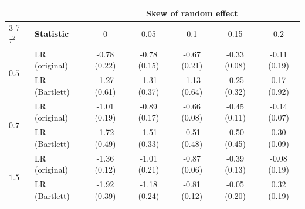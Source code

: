 \begin{tabular}{llccccc}
\toprule
 &  & \multicolumn{5}{c}{\textbf{Skew of random effect}} \\
\cmidrule(lr){3-7}
\textbf{$\tau^2$} & \textbf{Statistic} & 0 & 0.05 & 0.1 & 0.15 & 0.2 \\
\midrule
\multirow{2}{*}{$0.5$} & LR (original) & -0.78 (0.22) & -0.78 (0.15) & -0.67 (0.21) & -0.33 (0.08) & -0.11 (0.19) \\
 & LR (Bartlett) & -1.27 (0.61) & -1.31 (0.37) & -1.13 (0.64) & -0.25 (0.32) & 0.17 (0.92) \\
\midrule
\multirow{2}{*}{$0.7$} & LR (original) & -1.01 (0.19) & -0.89 (0.17) & -0.66 (0.08) & -0.45 (0.11) & -0.14 (0.07) \\
 & LR (Bartlett) & -1.72 (0.49) & -1.51 (0.33) & -0.51 (0.48) & -0.50 (0.45) & 0.30 (0.09) \\
\midrule
\multirow{2}{*}{$1.5$} & LR (original) & -1.36 (0.12) & -1.01 (0.21) & -0.87 (0.06) & -0.39 (0.13) & -0.08 (0.19) \\
 & LR (Bartlett) & -1.92 (0.39) & -1.18 (0.24) & -0.81 (0.12) & -0.05 (0.20) & 0.32 (0.19) \\
\bottomrule
\end{tabular}
